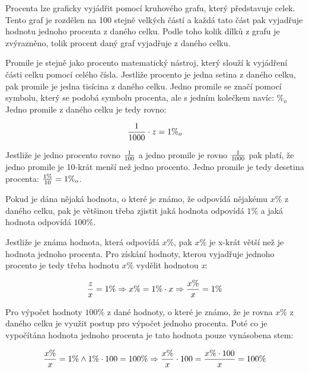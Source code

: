 
Procenta lze graficky vyjádřit pomocí kruhového grafu, který představuje celek. Tento graf je rozdělen na 100 stejně velkých částí a každá tato část pak vyjadřuje hodnotu jednoho procenta z daného celku. Podle toho kolik dílků z grafu je zvýrazněno, tolik procent daný graf vyjadřuje z daného celku.

\vskip 4mm
\centerline{}
\vskip 4mm


Promile je stejně jako procento matematický nástroj, který slouží k vyjádření části celku pomocí celého čísla. Jestliže procento je jedna setina z daného celku, pak promile je jedna tisícina z daného celku. Jedno promile se značí pomocí symbolu, který se podobá symbolu procenta, ale s jedním kolečkem navíc: $\%_o$ Jedno promile z daného celku je tedy rovno:

$${1\over 1000} \cdot z = 1\%_o $$

Jestliže je jedno procento rovno $1\over 100$ a jedno promile je rovno $1\over 1000$ pak platí, že jedno promile je 10-krát menší než jedno procento. Jedno promile je tedy desetina procenta: ${{1\%} \over 10} = 1\%_o$.


Pokud je dána nějaká hodnota, o které je známo, že odpovídá nějakému $x\%$ z daného celku, pak je většinou třeba zjistit jaká hodnota odpovídá $1\%$ a jaká hodnota odpovídá $100\%$.


Jestliže je známa hodnota, která odpovídá $x\%$, pak $x\%$ je x-krát větší než je hodnota jednoho procenta. Pro získání hodnoty, kterou vyjadřuje jednoho procento je tedy třeba hodnotu $x\%$ vydělit hodnotou {\it x}:

$$ {z \over x} = 1\% \Rightarrow x\% = 1\% \cdot x \Rightarrow {x\% \over x} = 1\% $$

Pro výpočet hodnoty $100\%$ z dané hodnoty, o které je známo, že je rovna $x\%$ z daného celku je využit postup pro výpočet jednoho procenta. Poté co je vypočítána hodnota jednoho procenta je tato hodnota pouze vynásobena stem:

$$ {x\%\over x} = 1\% \wedge 1\% \cdot 100 = 100\% \Rightarrow {x\%\over x}\cdot 100 = {{x\%\cdot 100}\over x} = 100\% $$


